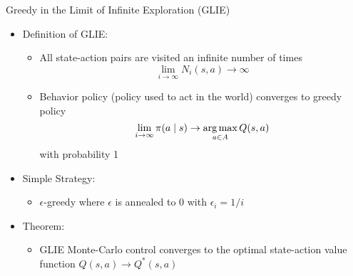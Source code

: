 \documentclass[aspectratio=169]{../latex_main/tntbeamer}  %
\begin{document}
\begin{frame}[c]{Greedy in the Limit of Infinite Exploration (GLIE)}
	
	\begin{itemize}
		\item Definition of GLIE:
		\begin{itemize}
			\item All state-action pairs are visited an infinite number of times
			$$ \lim_{i\to\infty} N_i(s,a) \to \infty$$
			\item Behavior policy (policy used to act in the world) converges to greedy
			policy
			$$\lim_{i\to \infty} \pi(a\mid s) \to \operatorname*{arg\,max}_{a\in A} Q(s,a)$$ with probability 1
		\end{itemize}
		\medskip
		\pause
		\item Simple Strategy:
		\begin{itemize}
			\item $\epsilon$-greedy where $\epsilon$ is annealed to $0$ with $\epsilon_i = 1 / i$
		\end{itemize}
		\medskip
		\pause
		\item Theorem:
		\begin{itemize}
			\item GLIE Monte-Carlo control converges to the optimal state-action value
			function $Q(s,a) \to Q^*(s,a)$
		\end{itemize}
	\end{itemize}
	
\end{frame}
\end{document}
